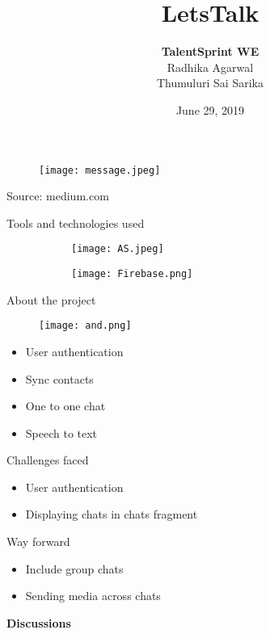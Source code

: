 \documentclass[14pt]{beamer}
\title{LetsTalk}
\author{\textbf{TalentSprint WE}\\
\vspace{3mm}
Radhika Agarwal\\
 Thumuluri Sai Sarika }
\date{June 29, 2019}
\begin{document}
\begin{frame}
\begin{figure}[H]
\centering
\texttt{[image: message.jpeg]}
\end{figure}
\hspace{8cm}\scriptsize{Source: medium.com}
\end{frame}


\frame{\titlepage}


\begin{frame}{Tools and technologies used}

\begin{figure}
  \begin{subfigure}[b]{0.4\textwidth}
    \texttt{[image: AS.jpeg]}

  \end{subfigure}
  \begin{subfigure}[b]{0.4\textwidth}
    \texttt{[image: Firebase.png]}
   \end{subfigure}
\end{figure}

\end{frame}

\begin{frame}
{About the project}

\vspace{1cm}
\begin{figure}[b]
\begin{flushright}
 \texttt{[image: and.png]}
 \end{flushright}
\end{figure} 

\pause
\vspace{-4cm}
    \begin{itemize}
        \item User authentication
        \pause
        \item Sync contacts
        \pause
        \item One to one chat
        \pause
        \item Speech to text
    \end{itemize}
\end{frame}



\begin{frame}{Challenges faced}
\begin{itemize}
\item User authentication
\item Displaying chats in chats fragment
\end{itemize}
\end{frame}

\begin{frame}{Way forward}
\begin{itemize}
\item Include group chats
\item Sending media across chats

\end{itemize}
\end{frame}

\begin{frame}
\textbf{\Large Discussions}
\end{frame}
\end{document}
